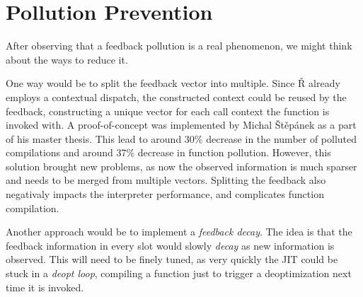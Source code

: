 \section{Pollution Prevention}

After observing that a feedback pollution is a real phenomenon, we might think about the ways to reduce it.

One way would be to split the feedback vector into multiple. Since Ř already employs a contextual dispatch, the constructed context could be reused by the feedback, constructing a unique vector for each call context the function is invoked with. A proof-of-concept was implemented by Michal Štěpánek as a part of his master thesis\cite{michal2025obohaceny}. This lead to around 30\% decrease in the number of polluted compilations and around 37\% decrease in function pollution. However, this solution brought new problems, as now the observed information is much sparser and needs to be merged from multiple vectors. Splitting the feedback also negativaly impacts the interpreter performance, and complicates function compilation.

Another approach would be to implement a \textit{feedback decay}. The idea is that the feedback information in every slot would slowly \textit{decay} as new information is observed. This will need to be finely tuned, as very quickly the JIT could be stuck in a \textit{deopt loop}, compiling a function just to trigger a deoptimization next time it is invoked.
